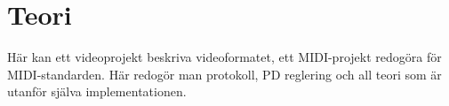 \documentclass[\docdir/tech.tex]{subfiles}
\begin{document}
\section{Teori}
Här kan ett videoprojekt beskriva videoformatet, ett MIDI-projekt redogöra för
MIDI-standarden. Här redogör man protokoll, PD reglering och all teori som är
utanför själva implementationen.
\end{document}

